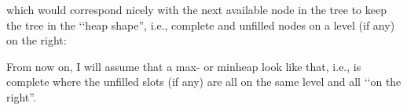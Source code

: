 

which would correspond nicely with the
next available node in the tree to keep the tree
in the \lq\lq heap shape'',
i.e., complete and unfilled nodes on a level
(if any) on the right:



From now on, I will assume that a max- or minheap
look like that,
i.e., is complete where the unfilled slots (if any)
are all on the same level
and all \lq\lq on the right''.






